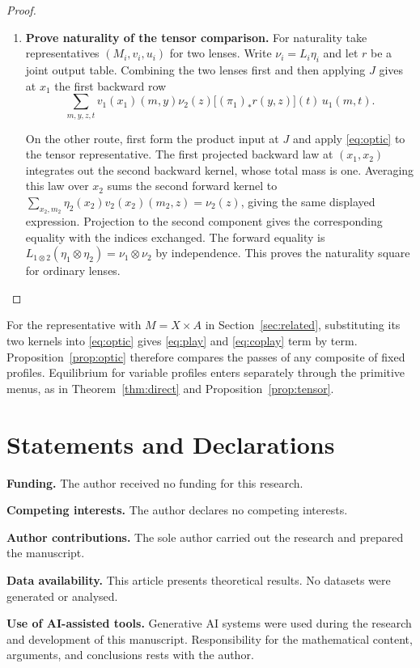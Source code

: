 \documentclass[11pt,a4paper]{article}
\theoremstyle{definition}
\begin{document}
\begin{proof}
\begin{enumerate}[titledsteps]
        \item \textbf{Prove naturality of the tensor comparison.} For naturality take representatives $(M_i,v_i,u_i)$ for two lenses. Write $\nu_i=L_i\eta_i$ and let $r$ be a joint output table. Combining the two lenses first and then applying $J$ gives at $x_1$ the first backward row
        \[
            \sum_{m,y,z,t}v_1(x_1)(m,y)\nu_2(z)
            \big[(\pi_1)_*r(y,z)\big](t)\,u_1(m,t).
        \]

        On the other route, first form the product input at $J$ and apply \eqref{eq:optic} to the tensor representative. The first projected backward law at $(x_1,x_2)$ integrates out the second backward kernel, whose total mass is one. Averaging this law over $x_2$ sums the second forward kernel to $\sum_{x_2,m_2}\eta_2(x_2)v_2(x_2)(m_2,z)=\nu_2(z)$, giving the same displayed expression. Projection to the second component gives the corresponding equality with the indices exchanged. The forward equality is $L_{1\otimes2}(\eta_1\otimes\eta_2)=\nu_1\otimes\nu_2$ by independence. This proves the naturality square for ordinary lenses.\qedhere
    \end{enumerate}
\end{proof}

For the representative with $M=X\times A$ in Section~\ref{sec:related}, substituting its two kernels into \eqref{eq:optic} gives \eqref{eq:play} and \eqref{eq:coplay} term by term. Proposition~\ref{prop:optic} therefore compares the passes of any composite of fixed profiles. Equilibrium for variable profiles enters separately through the primitive menus, as in Theorem~\ref{thm:direct} and Proposition~\ref{prop:tensor}.

\section*{Statements and Declarations}

\noindent\textbf{Funding.} The author received no funding for this research.

\smallskip
\noindent\textbf{Competing interests.} The author declares no competing interests.

\smallskip
\noindent\textbf{Author contributions.} The sole author carried out the research and prepared the manuscript.

\smallskip
\noindent\textbf{Data availability.} This article presents theoretical results. No datasets were generated or analysed.

\smallskip
\noindent\textbf{Use of AI-assisted tools.} Generative AI systems were used during the research and development of this manuscript. Responsibility for the mathematical content, arguments, and conclusions rests with the author.
\end{document}
